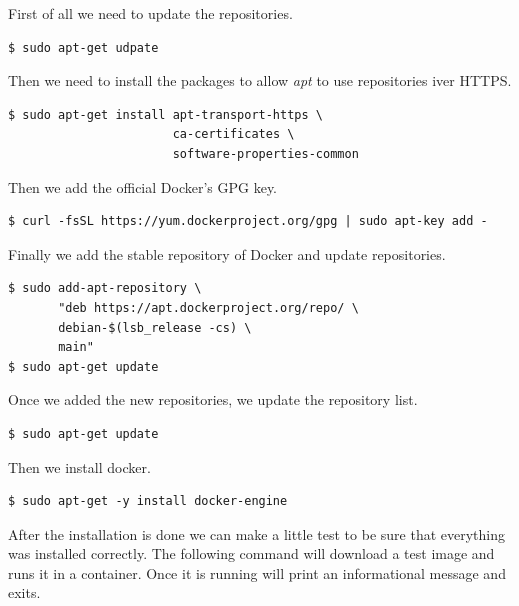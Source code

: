 First of all we need to update the repositories.

\begin{verbatim}
$ sudo apt-get udpate
\end{verbatim}

Then we need to install the packages to allow \textit{apt} to use repositories iver HTTPS.

\begin{verbatim}
$ sudo apt-get install apt-transport-https \
                       ca-certificates \
                       software-properties-common
\end{verbatim}

Then we add the official Docker's GPG key.

\begin{verbatim}
$ curl -fsSL https://yum.dockerproject.org/gpg | sudo apt-key add -
\end{verbatim}

Finally we add the stable repository of Docker and update repositories.

\begin{verbatim}
$ sudo add-apt-repository \
       "deb https://apt.dockerproject.org/repo/ \
       debian-$(lsb_release -cs) \
       main"
$ sudo apt-get update
\end{verbatim}

Once we added the new repositories, we update the repository list.

\begin{verbatim}
$ sudo apt-get update
\end{verbatim}

Then we install docker.

\begin{verbatim}
$ sudo apt-get -y install docker-engine
\end{verbatim}

After the installation is done we can make a little test to be sure that everything was installed correctly. The following command will download a test image and runs it in a container. Once it is running will print an informational message and exits.

